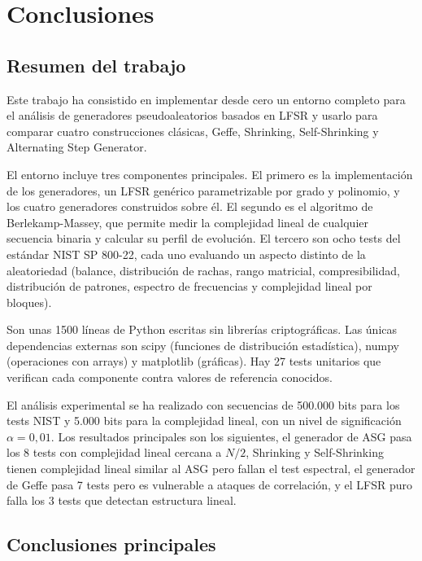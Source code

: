 \chapter{Conclusiones}
\label{cap:conclusiones}

\section{Resumen del trabajo}

Este trabajo ha consistido en implementar desde cero un entorno completo para el análisis de generadores pseudoaleatorios basados en LFSR
y usarlo para comparar cuatro construcciones clásicas, Geffe, Shrinking, Self-Shrinking y Alternating Step Generator.

El entorno incluye tres componentes principales. El primero es la implementación de los generadores, un LFSR genérico parametrizable por grado y polinomio,
y los cuatro generadores construidos sobre él. El segundo es el algoritmo de Berlekamp-Massey,
que permite medir la complejidad lineal de cualquier secuencia binaria y calcular su perfil de evolución.
El tercero son ocho tests del estándar NIST SP 800-22, cada uno evaluando un aspecto distinto de la aleatoriedad
(balance, distribución de rachas, rango matricial, compresibilidad, distribución de patrones, espectro de frecuencias y complejidad lineal por bloques).

Son unas 1500 líneas de Python escritas sin librerías criptográficas. Las únicas dependencias externas son scipy (funciones de distribución estadística),
numpy (operaciones con arrays) y matplotlib (gráficas). Hay 27 tests unitarios que verifican cada componente contra valores de referencia conocidos.

El análisis experimental se ha realizado con secuencias de 500.000 bits para los tests NIST y 5.000 bits para la complejidad lineal,
con un nivel de significación $\alpha = 0{,}01$. Los resultados principales son los siguientes,
el generador de ASG pasa los 8 tests con complejidad lineal cercana a $N/2$,
Shrinking y Self-Shrinking tienen complejidad lineal similar al ASG pero fallan el test espectral,
el generador de Geffe pasa 7 tests pero es vulnerable a ataques de correlación, y el LFSR puro falla los 3 tests que detectan estructura lineal.

\section{Conclusiones principales}

